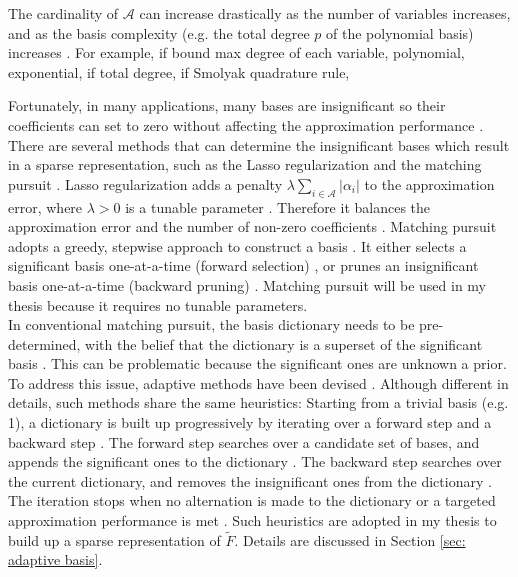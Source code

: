 The cardinality of $\mathcal{A}$ can increase drastically as the number of variables increases, and
as the basis complexity (e.g. the total degree $p$ of the polynomial basis) increases \cite{PCE}.
For example, if bound max degree of each variable, polynomial, exponential,
if total degree, 
if Smolyak quadrature rule, 


Fortunately, in many applications, 
many bases are insignificant so their coefficients can set to zero without affecting the approximation 
performance \cite{match pursuit}. 
There are several methods that can determine the insignificant bases which result 
in a sparse representation, such as the Lasso regularization 
\cite{Lasso variable selection} and the matching 
pursuit \cite{match pursuit}. Lasso regularization adds a penalty $\lambda
\sum_{i\in\mathcal{A}}|\alpha_i|$
to the approximation error, where $\lambda>0$ is a tunable parameter \cite{Lasso variable selection}. 
Therefore it balances the approximation error and the number of non-zero
coefficients \cite{Lasso variable selection}.
Matching pursuit adopts a greedy, stepwise approach to construct a basis \cite{match pursuit}.
It either selects a significant basis one-at-a-time (forward selection) \cite{forward selection},
or prunes an insignificant basis one-at-a-time (backward pruning) \cite{backward prune}.
Matching pursuit will be used in my thesis because it requires no tunable parameters. \\

In conventional matching pursuit, the basis dictionary needs to
be pre-determined, with the belief that the dictionary is a superset of the significant basis
\cite{adaptive basis 2}. 
This can be problematic because the significant ones are unknown a prior.
To address this issue, adaptive methods have been devised 
\cite{adaptive basis 1, adaptive basis 2, adaptive basis 3}.
Although different in details, such methods share the same heuristics: Starting from a trivial
basis (e.g. 1), a dictionary is built up progressively 
by iterating over a forward step and a backward step
\cite{adaptive basis 1, adaptive basis 2, adaptive basis 3}.
The forward step searches over a candidate set of bases, and appends the significant ones 
to the dictionary
\cite{adaptive basis 1, adaptive basis 2, adaptive basis 3}.
The backward step searches over the current dictionary, and removes the 
insignificant ones from the dictionary
\cite{adaptive basis 1, adaptive basis 2, adaptive basis 3}.
The iteration stops when no alternation is made to the dictionary or a targeted approximation
performance is met 
\cite{adaptive basis 1, adaptive basis 2, adaptive basis 3}.
Such heuristics are adopted in my thesis to build up 
a sparse representation of $\tilde{F}$. Details are discussed in Section \ref{sec: adaptive basis}.\\


